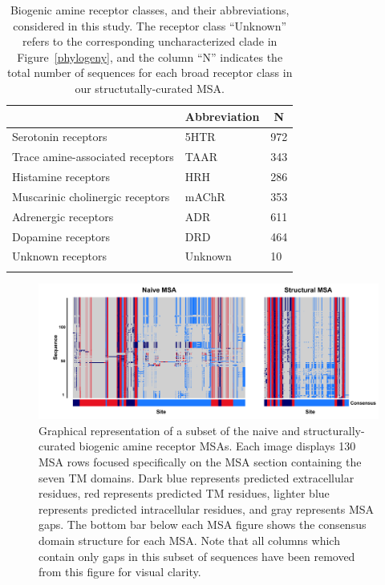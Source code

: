 \documentclass[fleqn,10pt]{wlpeerj}
\begin{document}
\bigskip

\begin{table}[htbp]
	\centering
	\begin{tabular}{l l l}
		\hline\noalign{\smallskip}
		\multicolumn{1}{c}{Receptor Class} & \multicolumn{1}{c}{Abbreviation} & \multicolumn{1}{c}{N} \\
		\hline\noalign{\smallskip}
		Serotonin receptors & \quad 5HTR & 972  \\
		Trace amine-associated receptors & \quad TAAR & 343 \\
		Histamine receptors & \quad HRH & 286 \\
		Muscarinic cholinergic receptors & \quad mAChR & 353  \\
		Adrenergic receptors & \quad ADR & 611  \\
		Dopamine receptors & \quad DRD & 464 \\
		Unknown receptors & \quad Unknown & 10 \\
		\noalign{\smallskip}\hline\noalign{\smallskip} 
	\end{tabular}
	\caption{\label{tab:abbrev_count} Biogenic amine receptor classes, and their abbreviations, considered in this study. The receptor class ``Unknown'' refers to the corresponding uncharacterized clade in Figure~\ref{phylogeny}, and the column ``N'' indicates the total number of sequences for each broad receptor class in our structutally-curated MSA.}
\end{table}


\newpage

\begin{figure}[htbp]
	\centerline{\includegraphics[width=7in]{figures/domains_naive_struc.png}}
	\caption{\label{domains} Graphical representation of a subset of the naive and structurally-curated biogenic amine receptor MSAs. Each image displays 130 MSA rows focused specifically on the MSA section containing the seven TM domains. Dark blue represents predicted extracellular residues, red represents predicted TM residues, lighter blue represents predicted intracellular residues, and gray represents MSA gaps. The bottom bar below each MSA figure shows the consensus domain structure for each MSA. Note that all columns which contain only gaps in this subset of sequences have been removed from this figure for visual clarity.}
\end{figure}
\end{document}
